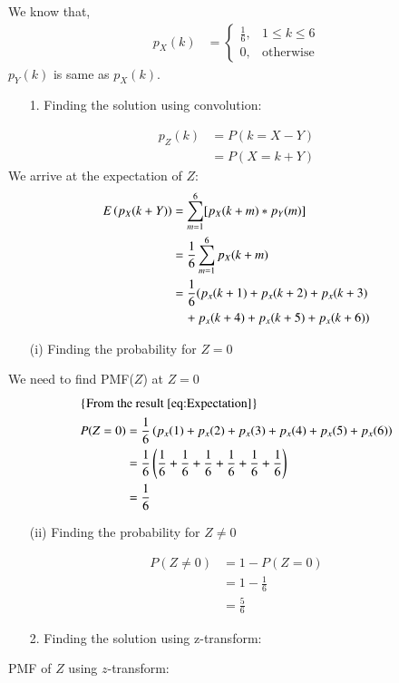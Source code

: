 \documentclass[journal,12pt,twocolumn]{IEEEtran}
\theoremstyle{remark}
\begin{document}
We know that,
\begin{align}
p_X(k) &= 
	\begin{cases}
		\frac{1}{6}, & 1 \leq k \leq 6 \\
		0, & \text{otherwise}
	\end{cases}
\end{align}
$p_Y(k)$ is same as $p_X(k)$.
\begin{enumerate}
\item[1.] Finding the solution using convolution:
\end{enumerate}
\begin{align}
p_Z(k) &= P(k = X-Y)\\
&= P(X = k+Y)
\end{align}
We arrive at the expectation of $Z$: 
\begin{align}
E\left(p_X(k+Y)\right) &= \sum^{6}_{m=1}[p_X(k+m)*p_Y(m)]\\
&= \frac{1}{6}\sum^6_{m=1} p_X(k+m)\\
&= \frac{1}{6}(p_x(k+1)+p_x(k+2)+p_x(k+3) \nonumber \\ &\quad +p_x(k+4)+p_x(k+5)+p_x(k+6)) \label{eq:Expectation}
\end{align}
\begin{enumerate}
\item[(i)] Finding the probability for $Z = 0$
\end{enumerate}
We need to find PMF($Z$) at $Z = 0$
\begin{align}
	\intertext{\{From the result \eqref{eq:Expectation}\}}
	P(Z=0) &= \frac{1}{6}\left(p_x(1)+p_x(2)+p_x(3)+p_x(4)+p_x(5)+p_x(6)\right)\\
	&= \frac{1}{6}\left(\frac{1}{6}+\frac{1}{6}+\frac{1}{6}+\frac{1}{6}+\frac{1}{6}+\frac{1}{6}\right)\\
	&= \frac{1}{6}	
\end{align}
\begin{enumerate}
\item[(ii)] Finding the probability for $Z \neq 0$
\end{enumerate}
\begin{align}
	P(Z \neq 0) &= 1-P(Z=0)\\
	&= 1-\frac{1}{6}\\
	&= \frac{5}{6}
\end{align}
\begin{enumerate}
\item[2.] Finding the solution using z-transform:
\end{enumerate}
PMF of $Z$ using $z$-transform:
\end{document}

